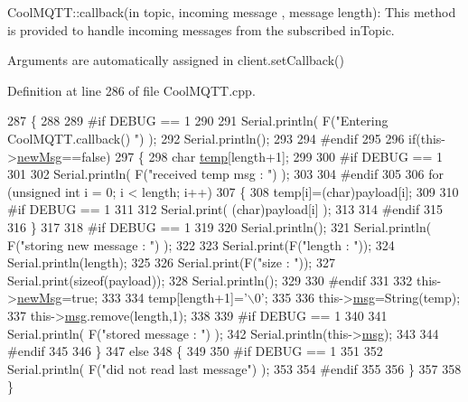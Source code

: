 Cool\+M\+Q\+T\+T\+::callback(in topic, incoming message , message length)\+: This method is provided to handle incoming messages from the subscribed in\+Topic.

Arguments are automatically assigned in client.\+set\+Callback() 

Definition at line 286 of file Cool\+M\+Q\+T\+T.\+cpp.


\begin{DoxyCode}
287 \{
288 
289 \textcolor{preprocessor}{#if DEBUG == 1}
290 
291     Serial.println( F(\textcolor{stringliteral}{"Entering CoolMQTT.callback() "}) );
292     Serial.println();
293 
294 \textcolor{preprocessor}{#endif }
295 
296     \textcolor{keywordflow}{if}(this->\hyperlink{class_cool_m_q_t_t_a3240388137b885775aadf38e96b24c6b}{newMsg}==\textcolor{keyword}{false})
297     \{
298         \textcolor{keywordtype}{char} \hyperlink{_irene3000_8h_a5905d48604152cf57aa6bfa087b49173}{temp}[length+1];
299 
300 \textcolor{preprocessor}{    #if DEBUG == 1}
301 
302         Serial.println( F(\textcolor{stringliteral}{"received temp msg : "}) );
303         
304 \textcolor{preprocessor}{    #endif}
305         
306         \textcolor{keywordflow}{for} (\textcolor{keywordtype}{unsigned} \textcolor{keywordtype}{int} i = 0; i < length; i++) 
307         \{
308             temp[i]=(char)payload[i];
309         
310 \textcolor{preprocessor}{        #if DEBUG == 1 }
311 
312             Serial.print( (\textcolor{keywordtype}{char})payload[i] );
313         
314 \textcolor{preprocessor}{        #endif}
315 
316         \}
317     
318 \textcolor{preprocessor}{    #if DEBUG == 1 }
319 
320         Serial.println();
321         Serial.println( F(\textcolor{stringliteral}{"storing new message : "}) );
322 
323         Serial.print(F(\textcolor{stringliteral}{"length : "}));
324         Serial.println(length);
325         
326         Serial.print(F(\textcolor{stringliteral}{"size : "}));
327         Serial.print(\textcolor{keyword}{sizeof}(payload));
328         Serial.println();
329     
330 \textcolor{preprocessor}{    #endif}
331 
332         this->\hyperlink{class_cool_m_q_t_t_a3240388137b885775aadf38e96b24c6b}{newMsg}=\textcolor{keyword}{true};
333 
334         temp[length+1]=\textcolor{charliteral}{'\(\backslash\)0'};
335 
336         this->\hyperlink{class_cool_m_q_t_t_af6b19e7074dbbb4ae493c44dcb53f7ff}{msg}=String(temp);
337         this->\hyperlink{class_cool_m_q_t_t_af6b19e7074dbbb4ae493c44dcb53f7ff}{msg}.remove(length,1);
338     
339 \textcolor{preprocessor}{    #if DEBUG == 1 }
340 
341         Serial.println( F(\textcolor{stringliteral}{"stored message : "}) );
342         Serial.println(this->\hyperlink{class_cool_m_q_t_t_af6b19e7074dbbb4ae493c44dcb53f7ff}{msg});
343     
344 \textcolor{preprocessor}{    #endif}
345 
346     \}
347     \textcolor{keywordflow}{else}
348     \{
349     
350 \textcolor{preprocessor}{    #if DEBUG == 1}
351 
352         Serial.println( F(\textcolor{stringliteral}{"did not read last message"}) );
353     
354 \textcolor{preprocessor}{    #endif }
355         
356     \}
357 
358 \}
\end{DoxyCode}

